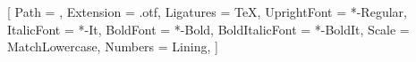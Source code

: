 \newcommand{\labelfont}{\sffamily\fontseries{sb}\selectfont}

%

\setmonofont{SourceCodePro}[
  Path = \bookfontpath,
  Extension = .otf,
  Ligatures = TeX,
  UprightFont = *-Regular,
  ItalicFont = *-It,
  BoldFont = *-Bold,
  BoldItalicFont = *-BoldIt,
  Scale = MatchLowercase,
  Numbers = Lining,
]


\usepackage{microtype}

\linespread{\tokLeadRatio}\selectfont

\setlength{\parindent}{0pt}
\setlength{\parskip}{\tokParSkip}

\usepackage[newcommands]{ragged2e}
\RaggedRight

\setlength{\emergencystretch}{3em}
